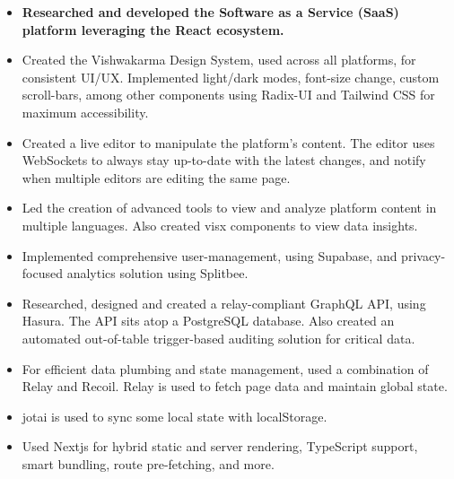 \documentclass[10pt,a4paper,ragged2e,withhyper]{altacv}
\begin{document}
\tagline{}

\makecvheader



\begin{paracol}{2}


\begin{itemize}
\item \textbf{Researched and developed the Software as a Service (SaaS) platform leveraging the React ecosystem.}
\item Created the Vishwakarma Design System, used across all platforms, for consistent UI/UX. Implemented light/dark modes, font-size change, custom scroll-bars, among other components using Radix-UI and Tailwind CSS for maximum accessibility.
\item Created a live editor to manipulate the platform's content.
      The editor uses WebSockets to always stay up-to-date with the latest changes, and notify when multiple editors are editing the same page.
\item Led the creation of advanced tools to view and analyze platform content in multiple languages. Also created visx components to view data insights.
\item Implemented comprehensive user-management, using Supabase, and privacy-focused analytics solution using Splitbee.
\item Researched, designed and created a relay-compliant GraphQL API, using Hasura.
      The API sits atop a PostgreSQL database. Also created an automated out-of-table trigger-based auditing solution for critical data.
\item For efficient data plumbing and state management, used a combination of Relay and Recoil.
      Relay is used to fetch page data and maintain global state.
\item jotai is used to sync some local state with localStorage.
\item Used Nextjs for hybrid static and server rendering, TypeScript support, smart bundling, route pre-fetching, and more.

\end{itemize}
\end{paracol}
\end{document}
